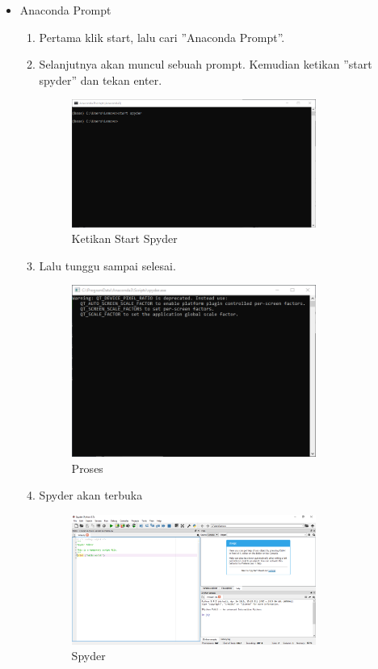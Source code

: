 \begin{itemize}
	\item Anaconda Prompt
	\begin{enumerate}
		
		\item Pertama klik start, lalu cari ''Anaconda Prompt''.
		\item Selanjutnya akan muncul sebuah prompt. Kemudian ketikan ''start spyder'' dan tekan enter.
		\begin{figure}[!htbp]
			\includegraphics[width=8cm]{figures/spy1.PNG}
			\centering
			\caption{Ketikan Start Spyder}
		\end{figure}
		
		\newpage
		\item Lalu tunggu sampai selesai.
		\begin{figure}[!htpb]
			\includegraphics[width=8cm]{figures/spy2.PNG}
			\centering
			\caption{Proses}
		\end{figure}
		
		\item Spyder akan terbuka
		\begin{figure}[!htbp]
			\includegraphics[width=8cm]{figures/spy3.PNG}
			\centering
			\caption{Spyder}
		\end{figure}
	\end{enumerate}
\end{itemize}
\newpage

